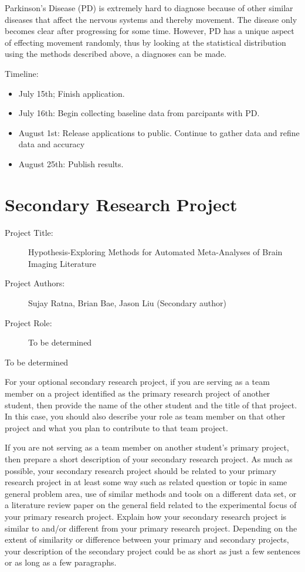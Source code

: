 \documentclass[12pt]{article}
\begin{document}
	Parkinson’s Disease (PD) is extremely hard to diagnose because of other similar diseases that affect the nervous systems and thereby movement. The disease only becomes clear after progressing for some time. However, PD has a unique aspect of effecting movement randomly, thus by looking at the statistical distribution using the methods described above, a diagnoses can be made.

Timeline:
\begin{itemize}
	\item{July 15th; Finish application.}
	\item{July 16th: Begin collecting baseline data from parcipants with PD.}
	\item{August 1st: Release applications to public. Continue to gather data and refine data and accuracy }
	\item{August 25th: Publish results.}
\end{itemize}

\section{Secondary Research Project}

\begin{description}
\item[Project Title:]  Hypothesis-Exploring Methods for Automated Meta-Analyses of Brain Imaging Literature
\item[Project Authors:] Sujay Ratna, Brian Bae, Jason Liu (Secondary author)
\item[Project Role:] To be determined
\end{description}
To be determined 

For your optional secondary research project, if you are serving as a team member on a project identified as the primary research project of another student, then provide the name of the other student and the title of that project.  In this case, you should also describe your role as team member on that other project and what you plan to contribute to that team project.

If you are not serving as a team member on another student's primary project, then  prepare a short description of your secondary research project. As much as possible, your secondary research project should be related to your primary research project in at least some way such as related question or topic in same general problem area, use of similar methods and tools on a different data set, or a literature review paper on the general field related to the experimental focus of your primary research project.  Explain how your secondary research project is similar to and/or different from your primary research project.  Depending on the extent of similarity or difference between your primary and secondary projects, your description of the secondary project could be as short as just a few sentences or as long as a few paragraphs. 
\end{document}
